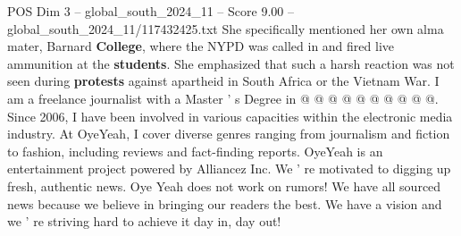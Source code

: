\begin{textsample}{POS Dim 3 – global\_south\_2024\_11 – Score 9.00 – global\_south\_2024\_11/117432425.txt}
She specifically mentioned her own alma mater, Barnard \textbf{College}, where the NYPD was called in and fired live ammunition at the \textbf{students}.
She emphasized that such a harsh reaction was not seen during \textbf{protests} against apartheid in South Africa or the Vietnam War.
I am a freelance journalist with a Master ' s Degree in @ @ @ @ @ @ @ @ @ @.
Since 2006, I have been involved in various capacities within the electronic media industry.
At OyeYeah, I cover diverse genres ranging from journalism and fiction to fashion, including reviews and fact-finding reports.
OyeYeah is an entertainment project powered by Alliancez Inc.
We ' re motivated to digging up fresh, authentic news.
Oye Yeah does not work on rumors!
We have all sourced news because we believe in bringing our readers the best.
We have a vision and we ' re striving hard to achieve it day in, day out!

\end{textsample}
